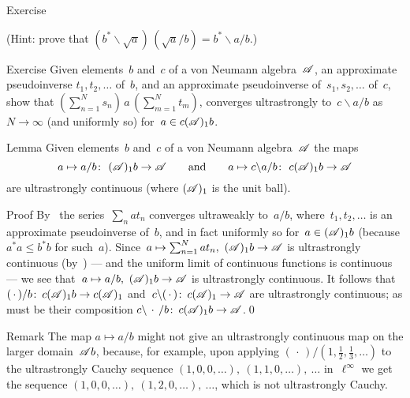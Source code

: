 \documentclass[a]{subfiles}
\begin{document}
\begin{parsec}
\begin{point}{Exercise}
\begin{enumerate}
(Hint: prove that $(b^*\backslash \sqrt{a})\,(\sqrt{a}/b)
= b^*\backslash a/b$.)
\end{enumerate}
\end{point}
\begin{point}{Exercise}%
Given elements~$b$ and~$c$ of a von Neumann algebra~$\mathscr{A}$,
an approximate pseudoinverse $t_1,t_2,\dotsc$
of~$b$,
and an approximate pseudoinverse of~$s_1,s_2,\dotsc$
of~$c$,
show that
$(\sum_{n=1}^N s_n) \,a\, (\sum_{m=1}^Nt_m)$,
converges ultrastrongly to~$c\backslash a /b$
as~$N\to\infty$
(and uniformly so) for~$a\in c(\mathscr{A})_1 b$.
\end{point}
\begin{point}{Lemma}%
Given elements~$b$ and~$c$  of a von Neumann algebra~$\mathscr{A}$
the maps 
\begin{equation*}
	a\mapsto a/b\colon \  (\mathscr{A})_1b \to \mathscr{A}
\qquad\text{and}\qquad
a\mapsto c\backslash a/b\colon\  c(\mathscr{A})_1b\to \mathscr{A}
\end{equation*}
are ultrastrongly continuous
(where $(\mathscr{A})_1$ is the unit ball).
\begin{point}{Proof}%
By~
the series~$\sum_n at_n$ converges ultraweakly to~$a/b$,
where~$t_1,t_2,\dotsc$
is an approximate pseudoinverse of~$b$,
and in fact uniformly so for~$a\in(\mathscr{A})_1 b$
(because $a^*a\leq b^*b$ for such~$a$).
Since~$a\mapsto \sum_{n=1}^N at_n,\ (\scrA)_1b\to\scrA$
is ultrastrongly continuous (by~)
--- and the uniform limit of continuous functions is continuous ---
we see that~$a\mapsto a/b,
\ (\mathscr{A})_1b\to\mathscr{A}$ is ultrastrongly continuous.
It follows that
$(\,\cdot\,)/b\colon\,c(\mathscr{A})_1b\to c(\mathscr{A})_1$
and~$c\backslash(\,\cdot\,)\colon\, c(\mathscr{A})_1\to\mathscr{A}$
are ultrastrongly continuous;
as must be their composition $c\backslash\,\cdot\,/b\colon\,
c(\mathscr{A})_1b\to\mathscr{A}$.\qed
\end{point}
\begin{point}{Remark}%
The map $a\mapsto a/b$ might not give
an ultrastrongly
continuous map on the larger domain~$\mathscr{A} b$,
because, for example, 
upon applying $(\,\cdot\,)/(1,\frac{1}{2},\frac{1}{3},\dotsc)$
to the ultrastrongly Cauchy 
sequence  $(1,0,0,\dotsc),\ (1,1,0,\dotsc),\ \dotsc$
in~$\ell^\infty$
we get the 
sequence $(1,0,0,\dotsc),\ (1,2,0,\dotsc),\ \dotsc$,
which is not ultrastrongly Cauchy.
\end{point}
\end{point}
\end{parsec}
\end{document}
